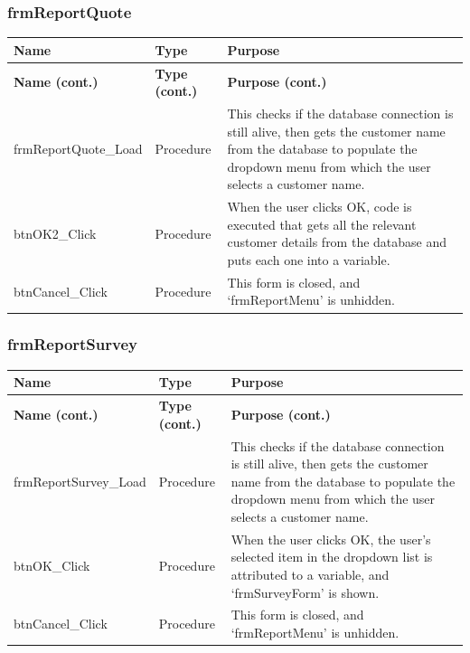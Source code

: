 	\subsubsection{frmReportQuote}
	\begin{longtable}{ | p{5cm} | p{3cm} | p{9cm} | }
		\hline
		\textbf{Name} & \textbf{Type} & \textbf{Purpose}\\
		\endfirsthead
		\hline
		\textbf{Name (cont.)} & \textbf{Type (cont.)} & \textbf{Purpose (cont.)}\\
		\endhead
		\hline
		frmReportQuote\_Load & Procedure & This checks if the database connection is still alive, then gets the customer name from the database to populate the dropdown menu from which the user selects a customer name.\\
		\hline
		btnOK2\_Click & Procedure & When the user clicks OK, code is executed that gets all the relevant customer details from the database and puts each one into a variable.\\
		\hline
		btnCancel\_Click & Procedure & This form is closed, and `frmReportMenu' is unhidden.\\
		\hline
	\end{longtable}
	
	\subsubsection{frmReportSurvey}
	\begin{longtable}{ | p{5cm} | p{3cm} | p{9cm} | }
		\hline
		\textbf{Name} & \textbf{Type} & \textbf{Purpose}\\
		\endfirsthead
		\hline
		\textbf{Name (cont.)} & \textbf{Type (cont.)} & \textbf{Purpose (cont.)}\\
		\endhead
		\hline
		frmReportSurvey\_Load & Procedure & This checks if the database connection is still alive, then gets the customer name from the database to populate the dropdown menu from which the user selects a customer name.\\
		\hline
		btnOK\_Click & Procedure & When the user clicks OK, the user's selected item in the dropdown list is attributed to a variable, and `frmSurveyForm' is shown.\\
		\hline
		btnCancel\_Click & Procedure & This form is closed, and `frmReportMenu' is unhidden.\\
		\hline
	\end{longtable}
	
